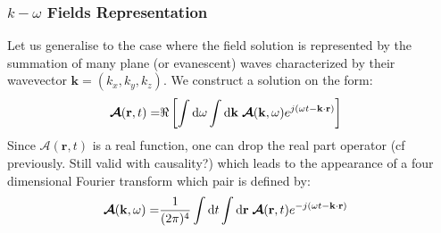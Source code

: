 \subsubsection{$k-\omega$ Fields Representation}\label{sec:spectralRepresentation}
Let us generalise to the case where the field solution is represented by the summation of many plane (or evanescent) waves characterized by their wavevector $\mathbf{k}=(k_x, k_y, k_z)$. We construct a solution on the form: 	
\begin{subequations}
	\begin{align}
	\boldsymbol{\mathcal{A}}(\mathbf{r}, t) =& \Re \left[
	\int \mathop{}\!\mathrm{d} \omega \int \mathop{}\!\mathrm{d} \mathbf{k} \;
	\mathbf{\boldsymbol{\mathcal{A}}}(\mathbf{k}, \omega) e^{j(\omega t - \mathbf{k}\cdot\mathbf{r})}
	\right]
	\end{align}
	\label{eq:k-spectralDefinition}
\end{subequations}
Since $\boldsymbol{\mathcal{A}}(\mathbf{r}, t)$ is a real function, one can drop the real part operator (cf previously. Still valid with causality?) which leads to the appearance of a four dimensional Fourier transform which pair is defined by:
 \begin{subequations}
 	\begin{align}
 	\boldsymbol{\mathcal{A}}(\mathbf{k}, \omega) =& 
 	\frac{1}{(2\pi)^4}
 	\int \mathop{}\!\mathrm{d} t \int \mathop{}\!\mathrm{d} \mathbf{r} \;
 	\mathbf{\boldsymbol{\mathcal{A}}}(\mathbf{r}, t) e^{-j(\omega t - \mathbf{k}\cdot\mathbf{r})}
 	\end{align}
 \end{subequations}

